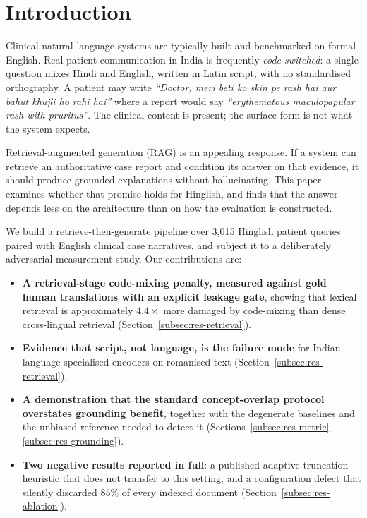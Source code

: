 \documentclass[pdflatex,sn-mathphys-num]{sn-jnl}
\theoremstyle{thmstyleone}
\theoremstyle{thmstyletwo}
\theoremstyle{thmstylethree}
\begin{document}
\maketitle


\renewcommand{\theHtable}{\thesection.\arabic{table}}

\section{Introduction}\label{sec:introduction}

Clinical natural-language systems are typically built and benchmarked on formal
English. Real patient communication in India is frequently \emph{code-switched}:
a single question mixes Hindi and English, written in Latin script, with no
standardised orthography. A patient may write \emph{``Doctor, meri beti ko skin pe
rash hai aur bahut khujli ho rahi hai''} where a report would say \emph{``erythematous
maculopapular rash with pruritus''}. The clinical content is present; the surface form
is not what the system expects.

Retrieval-augmented generation (RAG) is an appealing response. If a system can retrieve
an authoritative case report and condition its answer on that evidence, it should
produce grounded explanations without hallucinating. This paper examines whether that
promise holds for Hinglish, and finds that the answer depends less on the architecture
than on how the evaluation is constructed.

We build a retrieve-then-generate pipeline over 3,015 Hinglish patient queries paired
with English clinical case narratives, and subject it to a deliberately adversarial
measurement study. Our contributions are:

\begin{itemize}
\item \textbf{A retrieval-stage code-mixing penalty, measured against gold human
translations with an explicit leakage gate}, showing that lexical retrieval is
approximately $4.4\times$ more damaged by code-mixing than dense cross-lingual
retrieval (Section~\ref{subsec:res-retrieval}).
\item \textbf{Evidence that script, not language, is the failure mode} for
Indian-language-specialised encoders on romanised text
(Section~\ref{subsec:res-retrieval}).
\item \textbf{A demonstration that the standard concept-overlap protocol overstates
grounding benefit}, together with the degenerate baselines and the unbiased reference
needed to detect it (Sections~\ref{subsec:res-metric}--\ref{subsec:res-grounding}).
\item \textbf{Two negative results reported in full}: a published adaptive-truncation
heuristic that does not transfer to this setting, and a configuration defect that
silently discarded 85\% of every indexed document (Section~\ref{subsec:res-ablation}).
\end{itemize}
\end{document}

